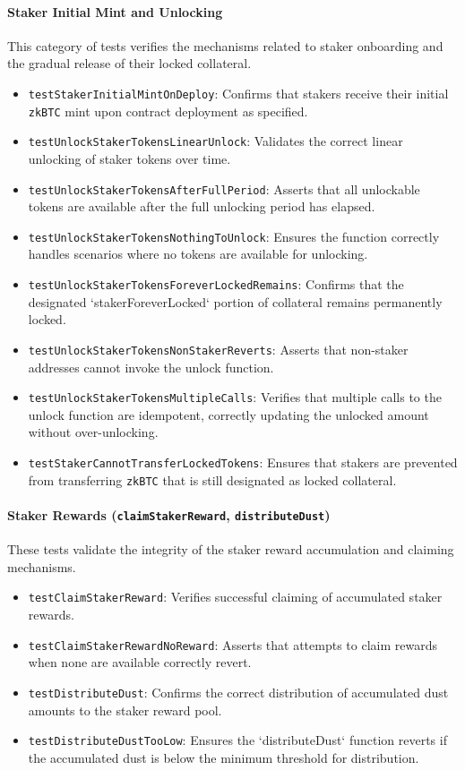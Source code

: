 \documentclass{DESSThesis}
\newcommand{\zktoken}{\texttt{zkBTC}}
\begin{document}
\paragraph{Staker Initial Mint and Unlocking}
This category of tests verifies the mechanisms related to staker onboarding and the gradual release of their locked collateral.
\begin{itemize}
    \item \texttt{testStakerInitialMintOnDeploy}: Confirms that stakers receive their initial \texttt{\zktoken} mint upon contract deployment as specified.
    \item \texttt{testUnlockStakerTokensLinearUnlock}: Validates the correct linear unlocking of staker tokens over time.
    \item \texttt{testUnlockStakerTokensAfterFullPeriod}: Asserts that all unlockable tokens are available after the full unlocking period has elapsed.
    \item \texttt{testUnlockStakerTokensNothingToUnlock}: Ensures the function correctly handles scenarios where no tokens are available for unlocking.
    \item \texttt{testUnlockStakerTokensForeverLockedRemains}: Confirms that the designated `stakerForeverLocked` portion of collateral remains permanently locked.
    \item \texttt{testUnlockStakerTokensNonStakerReverts}: Asserts that non-staker addresses cannot invoke the unlock function.
    \item \texttt{testUnlockStakerTokensMultipleCalls}: Verifies that multiple calls to the unlock function are idempotent, correctly updating the unlocked amount without over-unlocking.
    \item \texttt{testStakerCannotTransferLockedTokens}: Ensures that stakers are prevented from transferring \texttt{\zktoken} that is still designated as locked collateral.
\end{itemize}

\paragraph{Staker Rewards (\texttt{claimStakerReward}, \texttt{distributeDust})}
These tests validate the integrity of the staker reward accumulation and claiming mechanisms.
\begin{itemize}
    \item \texttt{testClaimStakerReward}: Verifies successful claiming of accumulated staker rewards.
    \item \texttt{testClaimStakerRewardNoReward}: Asserts that attempts to claim rewards when none are available correctly revert.
    \item \texttt{testDistributeDust}: Confirms the correct distribution of accumulated dust amounts to the staker reward pool.
    \item \texttt{testDistributeDustTooLow}: Ensures the `distributeDust` function reverts if the accumulated dust is below the minimum threshold for distribution.
\end{itemize}
\end{document}

